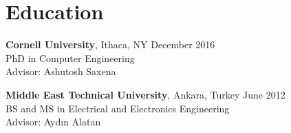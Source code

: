     \section{\mysidestyle \textcolor{olgray}{Education}}
    \textbf{Cornell University}, Ithaca, NY \hfill  December 2016 \vspace{1mm}\\\vspace{0mm}%
    PhD in Computer Engineering \hfill   \vspace{0mm} \\%
    Advisor: Ashutosh Saxena \\ \vspace{-5mm} %

    \textbf{Middle East Technical University}, Ankara, Turkey  \hfill  June 2012 \vspace{1mm}\\\vspace{0mm}%
    BS and MS in Electrical and Electronics Engineering  \hfill  \vspace{0mm} \\\vspace{0mm}%
	  Advisor: Ayd\i n Alatan \hfill \vspace{0mm}\\\vspace{-5mm}


